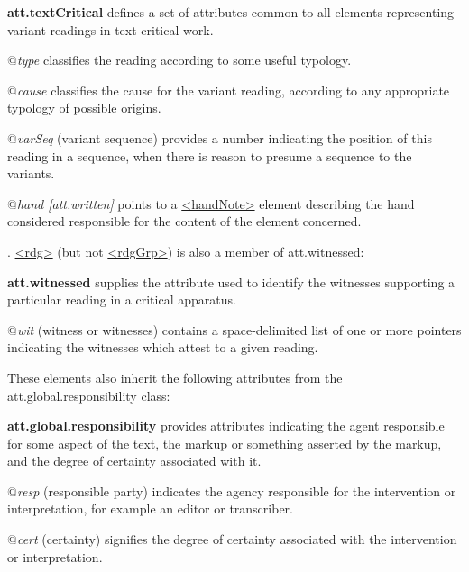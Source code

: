 \begin{sansreflist}
  
\item [\textbf{att.textCritical}] defines a set of attributes common to all elements representing variant readings in text critical work.\hfil\\[-10pt]\begin{sansreflist}
    \item[@{\itshape type}]
  classifies the reading according to some useful typology.
    \item[@{\itshape cause}]
  classifies the cause for the variant reading, according to any appropriate typology of possible origins.
    \item[@{\itshape varSeq}]
  (variant sequence) provides a number indicating the position of this reading in a sequence, when there is reason to presume a sequence to the variants. 
    \item[@{\itshape hand [att.written]}]
  points to a \hyperref[TEI.handNote]{<handNote>} element describing the hand considered responsible for the content of the element concerned.
\end{sansreflist}  
\end{sansreflist}
. \hyperref[TEI.rdg]{<rdg>} (but not \hyperref[TEI.rdgGrp]{<rdgGrp>}) is also a member of \textsf{att.witnessed}: 
\begin{sansreflist}
  
\item [\textbf{att.witnessed}] supplies the attribute used to identify the witnesses supporting a particular reading in a critical apparatus.\hfil\\[-10pt]\begin{sansreflist}
    \item[@{\itshape wit}]
  (witness or witnesses) contains a space-delimited list of one or more pointers indicating the witnesses which attest to a given reading.
\end{sansreflist}  
\end{sansreflist}
 These elements also inherit the following attributes from the \textsf{att.global.responsibility} class: 
\begin{sansreflist}
  
\item [\textbf{att.global.responsibility}] provides attributes indicating the agent responsible for some aspect of the text, the markup or something asserted by the markup, and the degree of certainty associated with it.\hfil\\[-10pt]\begin{sansreflist}
    \item[@{\itshape resp}]
  (responsible party) indicates the agency responsible for the intervention or interpretation, for example an editor or transcriber.
    \item[@{\itshape cert}]
  (certainty) signifies the degree of certainty associated with the intervention or interpretation.
\end{sansreflist}  
\end{sansreflist}
